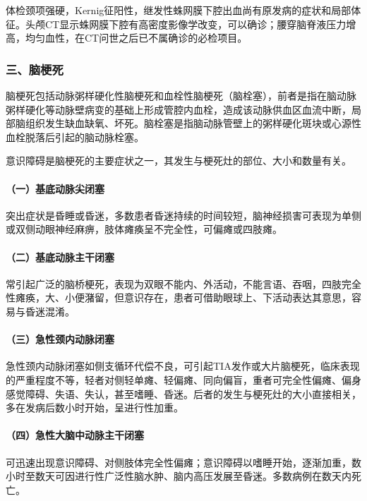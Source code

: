 体检颈项强硬，Kernig征阳性，继发性蛛网膜下腔出血尚有原发病的症状和局部体征。头颅CT显示蛛网膜下腔有高密度影像学改变，可以确诊；腰穿脑脊液压力增高，均匀血性，在CT问世之后已不属确诊的必检项目。

\subsubsection{三、脑梗死}

脑梗死包括动脉粥样硬化性脑梗死和血栓性脑梗死（脑栓塞），前者是指在脑动脉粥样硬化等动脉壁病变的基础上形成管腔内血栓，造成该动脉供血区血流中断，局部脑组织发生缺血缺氧、坏死。脑栓塞是指脑动脉管壁上的粥样硬化斑块或心源性血栓脱落后引起的脑动脉栓塞。

意识障碍是脑梗死的主要症状之一，其发生与梗死灶的部位、大小和数量有关。

\paragraph{（一）基底动脉尖闭塞}

突出症状是昏睡或昏迷，多数患者昏迷持续的时间较短，脑神经损害可表现为单侧或双侧动眼神经麻痹，肢体瘫痪呈不完全性，可偏瘫或四肢瘫。

\paragraph{（二）基底动脉主干闭塞}

常引起广泛的脑桥梗死，表现为双眼不能内、外活动，不能言语、吞咽，四肢完全性瘫痪，大、小便潴留，但意识存在，患者可借助眼球上、下活动表达其意思，容易与昏迷混淆。

\paragraph{（三）急性颈内动脉闭塞}

急性颈内动脉闭塞如侧支循环代偿不良，可引起TIA发作或大片脑梗死，临床表现的严重程度不等，轻者对侧轻单瘫、轻偏瘫、同向偏盲，重者可完全性偏瘫、偏身感觉障碍、失语、失认，甚至嗜睡、昏迷。后者的发生与梗死灶的大小直接相关，多在发病后数小时开始，呈进行性加重。

\paragraph{（四）急性大脑中动脉主干闭塞}

可迅速出现意识障碍、对侧肢体完全性偏瘫；意识障碍以嗜睡开始，逐渐加重，数小时至数天可因进行性广泛性脑水肿、脑内高压发展至昏迷。多数病例在数天内死亡。

